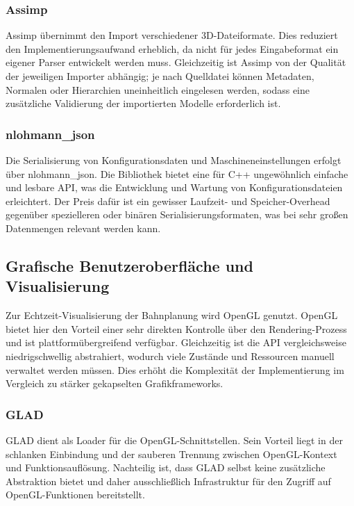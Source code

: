         \subsubsection{Assimp}
        Assimp übernimmt den Import verschiedener 3D-Dateiformate.
        Dies reduziert den Implementierungsaufwand erheblich,
        da nicht für jedes Eingabeformat ein eigener Parser entwickelt werden muss.
        Gleichzeitig ist Assimp von der Qualität der jeweiligen Importer abhängig;
        je nach Quelldatei können Metadaten, Normalen oder Hierarchien uneinheitlich eingelesen werden,
        sodass eine zusätzliche Validierung der importierten Modelle erforderlich ist.

        \subsubsection{nlohmann\_json}
        Die Serialisierung von Konfigurationsdaten und Maschineneinstellungen erfolgt über nlohmann\_json.
        Die Bibliothek bietet eine für C++ ungewöhnlich einfache und lesbare \ac{API},
        was die Entwicklung und Wartung von Konfigurationsdateien erleichtert.
        Der Preis dafür ist ein gewisser Laufzeit- und Speicher-Overhead gegenüber spezielleren oder binären Serialisierungsformaten,
        was bei sehr großen Datenmengen relevant werden kann.

        \subsection{Grafische Benutzeroberfläche und Visualisierung}
        Zur Echtzeit-Visualisierung der Bahnplanung wird \ac{OpenGL} genutzt.
        \ac{OpenGL} bietet hier den Vorteil einer sehr direkten Kontrolle über den Rendering-Prozess
        und ist plattformübergreifend verfügbar.
        Gleichzeitig ist die \ac{API} vergleichsweise niedrigschwellig abstrahiert,
        wodurch viele Zustände und Ressourcen manuell verwaltet werden müssen.
        Dies erhöht die Komplexität der Implementierung im Vergleich zu stärker gekapselten Grafikframeworks.

        \subsubsection{GLAD} 
        GLAD dient als Loader für die \ac{OpenGL}-Schnittstellen.
        Sein Vorteil liegt in der schlanken Einbindung und der sauberen Trennung zwischen \ac{OpenGL}-Kontext und Funktionsauflösung.
        Nachteilig ist, dass GLAD selbst keine zusätzliche Abstraktion bietet und daher ausschließlich Infrastruktur für den Zugriff auf \ac{OpenGL}-Funktionen bereitstellt.

